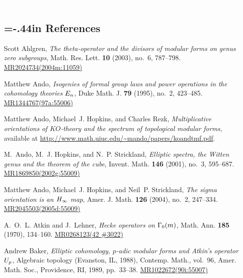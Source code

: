 \documentclass{gtpart}
\theoremstyle{definition}
\theoremstyle{remark}
\renewcommand{\=}{\approx}
\renewcommand{\-}{\sim}
\newcommand{\wt}[1]{\textcolor{white}{#1} \!~}
\numberwithin{equation}{section}
\begin{document}
% 
% 

\newpage
\renewcommand\refname{}
\newcommand{\AX}[1]{\href{http://arxiv.org/abs/#1}{arXiv:#1}}
\newcommand{\MRn}[2]{\href{http://www.ams.org/mathscinet-getitem?mr=#1}{MR#1#2}}
\newcommand{\name}{TateNormalLevelResolutions.pdf}
\wt{.}\vspace{-1.04in}
\begin{thebibliography}

\section*{\leftskip=-.44in References \vspace{.17in}}

Scott Ahlgren, \emph{The theta-operator and the divisors of modular forms on
  genus zero subgroups}, Math. Res. Lett. \textbf{10} (2003), no.~6,
  787--798. \MRn{2024734}{(2004m:11059)}

Matthew Ando, \emph{Isogenies of formal group laws and power operations in the
  cohomology theories {$E\sb n$}}, Duke Math. J. \textbf{79} (1995), no.~2,
  423--485. \MRn{1344767}{(97a:55006)}

Matthew Ando, Michael~J. Hopkins, and Charles Rezk, \emph{Multiplicative
  orientations of {$KO$}-theory and the spectrum of topological modular forms}, 
  available at \href{http://www.math.uiuc.edu/~mando/papers/koandtmf.pdf}
  {http://www.math.uiuc.edu/\textasciitilde mando/papers/koandtmf.pdf}.

M.~Ando, M.~J. Hopkins, and N.~P. Strickland, \emph{Elliptic spectra, the
  {W}itten genus and the theorem of the cube}, Invent. Math. \textbf{146}
  (2001), no.~3, 595--687. \MRn{1869850}{(2002g:55009)}

Matthew Ando, Michael~J. Hopkins, and Neil~P. Strickland, \emph{The sigma
  orientation is an {$H\sb \infty$} map}, Amer. J. Math. \textbf{126} (2004),
  no.~2, 247--334. \MRn{2045503}{(2005d:55009)}

A.~O.~L. Atkin and J.~Lehner, \emph{Hecke operators on {$\Gamma \sb{0}(m)$}},
  Math. Ann. \textbf{185} (1970), 134--160. \MRn{0268123}{(42 \#3022)}

Andrew Baker, \emph{Elliptic cohomology, {$p$}-adic modular forms and {A}tkin's
  operator {$U\sb p$}}, Algebraic topology ({E}vanston, {IL}, 1988), Contemp.
  Math., vol.~96, Amer. Math. Soc., Providence, RI, 1989, pp.~33--38.
  \MRn{1022672}{(90i:55007)}


\end{thebibliography}
\end{document}
